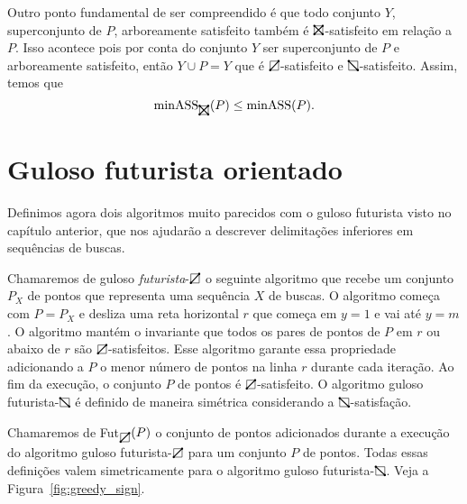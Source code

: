 Outro ponto fundamental de ser compreendido é que todo conjunto $Y$, superconjunto de $P$, arboreamente satisfeito também é $\recttotal$-satisfeito em relação a $P$. Isso acontece pois por conta do conjunto $Y$ ser superconjunto de $P$ e arboreamente satisfeito, então $Y \cup P = Y$ que é $\rectpos$-satisfeito e $\rectneg$-satisfeito. Assim, temos que
\begin{equation} \label{eq:minASS_orientado_menor_ou_igual_minASS}
    \text{minASS}_{\recttotal}(P) \leq \text{minASS}(P).
\end{equation}

\section{Guloso futurista orientado}

Definimos agora dois algoritmos muito parecidos com o guloso futurista visto no capítulo anterior, que nos ajudarão a descrever delimitações inferiores em sequências de buscas. 

Chamaremos de guloso \textit{futurista}-$\rectpos$ o seguinte algoritmo que recebe um conjunto $P_X$ de pontos que representa uma sequência $X$ de buscas. O algoritmo começa com $P = P_X$ e desliza uma reta horizontal $r$ que começa em $y = 1$ e vai até $y = m$. O algoritmo mantém o invariante que todos os pares de pontos de $P$ em $r$ ou abaixo de $r$ são $\rectpos$-satisfeitos. Esse algoritmo garante essa propriedade adicionando a $P$ o menor número de pontos na linha $r$ durante cada iteração. Ao fim da execução, o conjunto $P$ de pontos é $\rectpos$-satisfeito. O algoritmo guloso futurista-$\rectneg$ é definido de maneira simétrica considerando a $\rectneg$-satisfação.

Chamaremos de Fut$_{\rectpos}(P)$ o conjunto de pontos adicionados durante a execução do algoritmo guloso futurista-$\rectpos$ para um conjunto $P$ de pontos. Todas essas definições valem simetricamente para o algoritmo guloso futurista-$\rectneg$.
Veja a Figura~\ref{fig:greedy_sign}.

